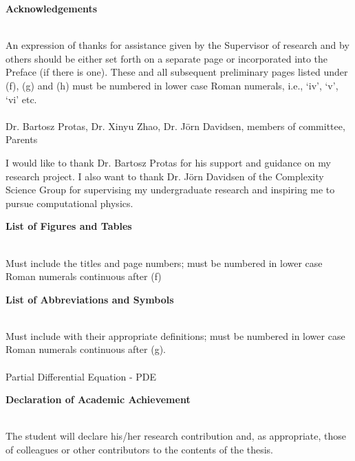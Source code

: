 \documentclass[12pt]{article}
\numberwithin{equation}{section}
\begin{document}
\pagebreak

\begin{large}
\textbf{Acknowledgements}
\\~\\
\end{large}
An expression of thanks for assistance given by the Supervisor of research and by others should be either 
set forth on a separate page or incorporated into the Preface (if there is one). These and all subsequent 
preliminary pages listed under (f), (g) and (h) must be numbered in lower case Roman numerals, i.e., ‘iv’, 
‘v’, ‘vi’ etc. 
\\~\\
Dr. Bartosz Protas, Dr. Xinyu Zhao, Dr. J\"{o}rn Davidsen, members of committee, Parents 


I would like to thank Dr. Bartosz Protas for his support and guidance on my research project.
I also want to thank Dr. J\"{o}rn Davidsen of the Complexity Science Group for supervising my undergraduate research and inspiring me to pursue computational physics.


\pagebreak

{
  \hypersetup{linkcolor=black}
  \tableofcontents
}

\pagebreak

\begin{large}
\textbf{List of Figures and Tables}
\\~\\
\end{large}
Must include the titles and page numbers; must be numbered in lower case Roman numerals continuous after 
(f)

\pagebreak

\begin{large}
\textbf{List of Abbreviations and Symbols}
\\~\\
\end{large}
Must include with their appropriate definitions; must be numbered in lower case Roman numerals continuous after (g).
\\~\\
Partial Differential Equation - PDE

\pagebreak

\begin{large}
\textbf{Declaration of Academic Achievement}
\\~\\
\end{large}
The student will declare his/her research contribution and, as appropriate, those of colleagues or other 
contributors to the contents of the thesis.
\end{document}
